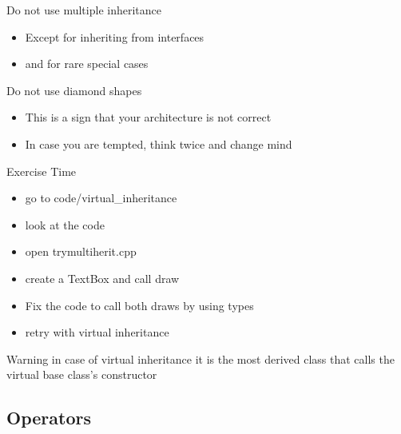 \begin{frame}[fragile]
  \begin{block}{Do not use multiple inheritance}
    \begin{itemize}
    \item Except for inheriting from interfaces
    \item and for rare special cases
    \end{itemize}
  \end{block}
  \pause
  \begin{alertblock}{Do not use diamond shapes}
    \begin{itemize}
    \item This is a sign that your architecture is not correct
    \item In case you are tempted, think twice and change mind
    \end{itemize}
  \end{alertblock}
\end{frame}

\begin{frame}[fragile]
  \begin{alertblock}{Exercise Time}
    \begin{itemize}
    \item go to code/virtual\_inheritance
    \item look at the code
    \item open trymultiherit.cpp
    \item create a TextBox and call draw
    \item Fix the code to call both draws by using types
    \item retry with virtual inheritance
    \end{itemize}
  \end{alertblock}
\end{frame}

\begin{frame}[fragile]
  \begin{alertblock}{Warning}
    in case of virtual inheritance it is the most derived class that calls the virtual base class's constructor
  \end{alertblock}
\end{frame}


\subsection[Op]{Operators}

